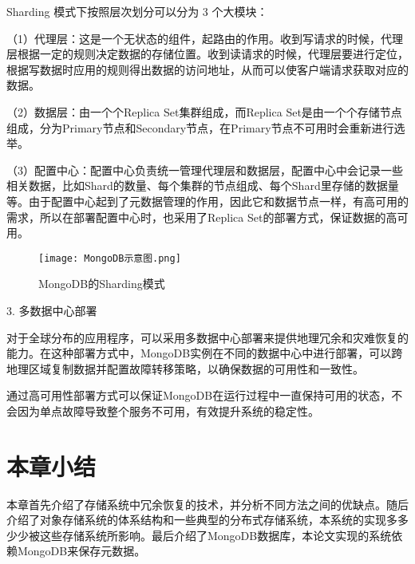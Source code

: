 Sharding 模式下按照层次划分可以分为 3 个大模块：

（1）代理层：这是一个无状态的组件，起路由的作用。收到写请求的时候，代理层根据一定的规则决定数据的存储位置。收到读请求的时候，代理层要进行定位，根据写数据时应用的规则得出数据的访问地址，从而可以使客户端请求获取对应的数据。

（2）数据层：由一个个Replica Set集群组成，而Replica Set是由一个个存储节点组成，分为Primary节点和Secondary节点，在Primary节点不可用时会重新进行选举。

（3）配置中心：配置中心负责统一管理代理层和数据层，配置中心中会记录一些相关数据，比如Shard的数量、每个集群的节点组成、每个Shard里存储的数据量等。由于配置中心起到了元数据管理的作用，因此它和数据节点一样，有高可用的需求，所以在部署配置中心时，也采用了Replica Set的部署方式，保证数据的高可用。

\begin{figure}[h]
    \centering
    \texttt{[image: MongoDB示意图.png]}
    \caption{MongoDB的Sharding模式}
\end{figure}

3. 多数据中心部署

对于全球分布的应用程序，可以采用多数据中心部署来提供地理冗余和灾难恢复的能力。在这种部署方式中，MongoDB实例在不同的数据中心中进行部署，可以跨地理区域复制数据并配置故障转移策略，以确保数据的可用性和一致性。

通过高可用性部署方式可以保证MongoDB在运行过程中一直保持可用的状态，不会因为单点故障导致整个服务不可用，有效提升系统的稳定性。

\section{本章小结}%
本章首先介绍了存储系统中冗余恢复的技术，并分析不同方法之间的优缺点。随后介绍了对象存储系统的体系结构和一些典型的分布式存储系统，本系统的实现多多少少被这些存储系统所影响。最后介绍了MongoDB数据库，本论文实现的系统依赖MongoDB来保存元数据。
